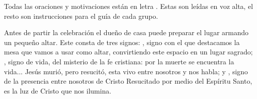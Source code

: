 Todas las oraciones y motivaciones están en letra . Estas son leídas en voz alta, el resto son instrucciones para el guía de cada grupo.

Antes de partir la celebración el dueño de casa puede preparar el lugar armando un pequeño altar. Este consta de tres signos: , signo con el que destacamos la mesa que vamos a usar como altar, convirtiendo este espacio en un lugar sagrado; , signo de vida, del misterio de la fe cristiana: por la muerte se encuentra la vida... Jesús murió, pero resucitó, esta vivo entre nosotros y nos habla; y , signo de la presencia entre nosotros de Cristo Resucitado por medio del Espíritu Santo, es la luz de Cristo que nos ilumina.
